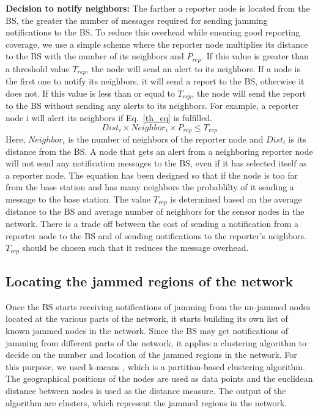 \documentclass[conference]{IEEEtran}
\begin{document}
\begin{list}{}{\leftmargin=1em}
\item
{\bf Decision to notify neighbors:} The farther a reporter node is located from the BS, the greater the number of messages required for sending jamming notifications to the BS. To reduce this overhead while ensuring good reporting coverage, we use a simple scheme where the reporter node multiplies its distance to the BS with the number of its neighbors and  $P_{rep}$. If this value is greater than a threshold value $T_{rep}$, the node will send an alert to its neighbors. If a node is the first one to notify its neighbors, it will send a report to the BS, otherwise it does not. If this value is less than or equal to $T_{rep}$, the node will send the report to the BS without sending any alerts to its neighbors. For example, a reporter node i will alert its neighbors if Eq.~\ref{th_eq} is fulfilled.
\begin{equation}
Dist_{i} \times Neighbor_{i} \times P_{rep} \leq T_{rep}
\label{th_eq}
\end{equation}
Here, $Neighbor_{i}$ is the number of neighbors of the reporter node and $Dist_{i}$ is its distance from the BS. 
A node that gets an alert from a neighboring reporter node will not send any notification messages to the BS, even if it has selected itself as a reporter node. 
\indent
The equation has been designed so that if the node is too far from the base station and has many neighbors the probablilty of it sending a message to the base station. The value $T_{rep}$ is determined based on the average distance to the BS and average number of neighbors for the sensor nodes in the network. There is a trade off between the cost of sending a notification from a reporter node to the BS and of sending notifications to the reporter's neighbors. $T_{rep}$ should be chosen such that it reduces the message overhead. 

\end{list}

\subsection{Locating the jammed regions of the network}
\label{reg_find}

Once the BS starts receiving notifications of jamming from the un-jammed nodes located at the various parts of the network, it starts building its own list of known jammed nodes in the network. Since the BS may get notifications of jamming from different parts of the network, it applies a clustering algorithm to decide on the number and location of the jammed regions in the network. For this purpose, we used k-means \cite{KMEANS, KMEANS67}, which is a partition-based clustering algorithm. The geographical positions of the nodes are used as data points and the euclidean distance between nodes is used as the distance measure. The output of the algorithm are clusters, which represent the jammed regions in the network.
\end{document}
